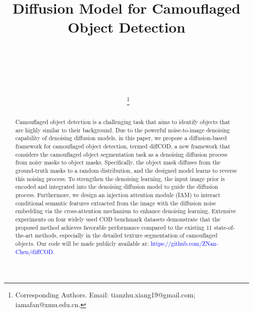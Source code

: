\documentclass{ecai}
\begin{document}
\begin{frontmatter}

\title{Diffusion Model for Camouflaged Object Detection}  %

\author[A]{~}
\author[B]{~}
\author[C{;$\ast$}]{~}
\author[A]{~\thanks{Corresponding Authors. Email: tianzhu.xiang19@gmail.com; 	iamafan@xmu.edu.cn.}}


\address[A]{School of Informatics, Xiamen University, Xiamen, China} %
\address[B]{Department of Computer Science and Engineering, HKUST, Hong Kong, China}
\address[C]{G42, Abu Dhabi, UAE}


\begin{abstract}
Camouflaged object detection is a challenging task that aims to identify objects that are highly similar to their background. Due to the powerful noise-to-image denoising capability of denoising diffusion models, in this paper, we propose a diffusion-based framework for camouflaged object detection, termed diffCOD, a new framework that considers the camouflaged object segmentation task as a denoising diffusion process from noisy masks to object masks. Specifically, the object mask diffuses from the ground-truth masks to a random distribution, and the designed model learns to reverse this noising process. To strengthen the denoising learning, the input image prior is encoded and integrated into the denoising diffusion model to guide the diffusion process. Furthermore, we design an injection attention module (IAM) to interact conditional semantic features extracted from the image with the diffusion noise embedding via the cross-attention mechanism to enhance denoising learning. Extensive experiments on four widely used COD benchmark datasets demonstrate that the proposed method achieves favorable performance compared to the existing 11 state-of-the-art methods, especially in the detailed texture segmentation of camouflaged objects. Our code will be made publicly available at: \textcolor{blue}{{https://github.com/ZNan-Chen/diffCOD}}. 



\end{abstract}
\end{frontmatter}
\end{document}
